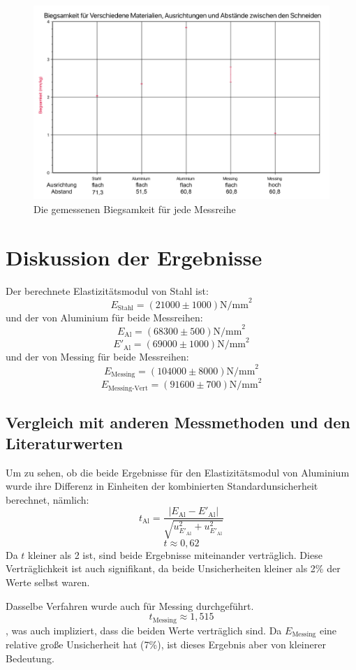 \documentclass[11pt,a4paper]{article}
\begin{document}
\begin{figure}[h]
	\centering
	\includegraphics[width=\linewidth]{Abb5}
	\caption{Die gemessenen Biegsamkeit für jede Messreihe}
\end{figure}


\section{Diskussion der Ergebnisse}
Der berechnete Elastizitätsmodul von Stahl ist:
$$E_\textrm{Stahl} = (21000 \pm 1000)\textrm{N/mm}^2$$
und der von Aluminium für beide Messreihen:
$$E_\textrm{Al} = (68300 \pm 500)\textrm{N/mm}^2$$
$$E'_\textrm{Al} = (69000 \pm 1000)\textrm{N/mm}^2$$
und der von Messing für beide Messreihen:
$$E_\textrm{Messing} = (104000 \pm 8000)\textrm{N/mm}^2$$
$$E_\textrm{Messing-Vert} = (91600 \pm 700)\textrm{N/mm}^2$$

\subsection{Vergleich mit anderen Messmethoden und den Literaturwerten}
Um zu sehen, ob die beide Ergebnisse für den Elastizitätsmodul von Aluminium wurde ihre Differenz in Einheiten der kombinierten Standardunsicherheit berechnet, nämlich:
$$ t_\textrm{Al} = \frac{|E_\textrm{Al}-E'_\textrm{Al}|}{
\sqrt{u_{E'_\textrm{Al}}^2+u_{E'_\textrm{Al}}^2}}$$
$$ t \approx 0,62 $$
Da $t$ kleiner als 2 ist, sind beide Ergebnisse miteinander verträglich. Diese Verträglichkeit ist auch signifikant, da beide Unsicherheiten kleiner als 2\% der Werte selbst waren. 

Dasselbe Verfahren wurde auch für Messing durchgeführt.
$$ t_\textrm{Messing} \approx 1,515 $$
, was auch impliziert, dass die beiden Werte verträglich sind. Da $E_\textrm{Messing}$ eine relative große Unsicherheit hat (7\%), ist dieses Ergebnis aber von kleinerer Bedeutung. 
\end{document}
